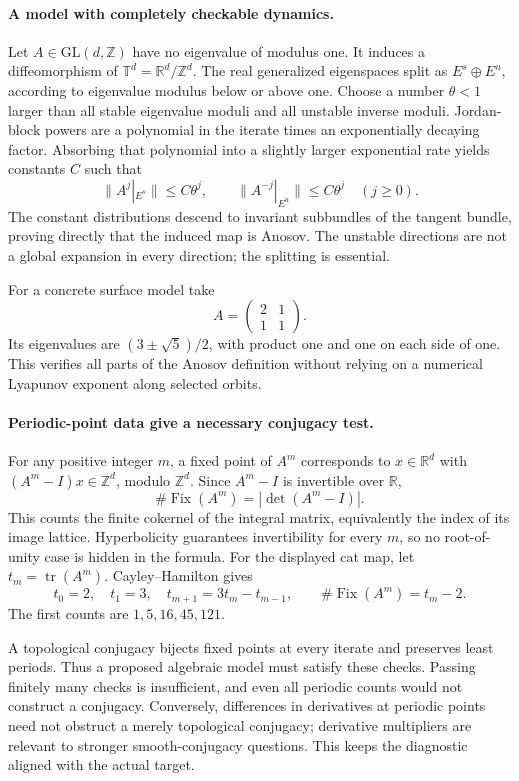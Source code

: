 \documentclass[11pt]{article}
\begin{document}
\paragraph{A model with completely checkable dynamics.}
Let $A\in\mathrm{GL}(d,\mathbb Z)$ have no eigenvalue of modulus one.
It induces a diffeomorphism of $\mathbb T^d=\mathbb R^d/\mathbb Z^d$.
The real generalized eigenspaces split as $E^s\oplus E^u$, according
to eigenvalue modulus below or above one. Choose a number $\theta<1$
larger than all stable eigenvalue moduli and all unstable inverse
moduli. Jordan-block powers are a polynomial in the iterate times
an exponentially decaying factor. Absorbing that polynomial into a
slightly larger exponential rate yields constants $C$ such that
\[
 \|A^j|_{E^s}\|\le C\theta^j,
 \qquad \|A^{-j}|_{E^u}\|\le C\theta^j\quad(j\ge0).
\]
The constant distributions descend to invariant subbundles of the
tangent bundle, proving directly that the induced map is Anosov.
The unstable directions are not a global expansion in every direction;
the splitting is essential.

For a concrete surface model take
\[
                   A=\begin{pmatrix}2&1\\1&1\end{pmatrix}.
\]
Its eigenvalues are $(3\pm\sqrt5)/2$, with product one and one on
each side of one. This verifies all parts of the Anosov definition
without relying on a numerical Lyapunov exponent along selected orbits.

\paragraph{Periodic-point data give a necessary conjugacy test.}
For any positive integer $m$, a fixed point of $A^m$ corresponds to
$x\in\mathbb R^d$ with $(A^m-I)x\in\mathbb Z^d$, modulo
$\mathbb Z^d$. Since $A^m-I$ is invertible over $\mathbb R$,
\[
             \#\operatorname{Fix}(A^m)=|\det(A^m-I)|.
\]
This counts the finite cokernel of the integral matrix, equivalently
the index of its image lattice. Hyperbolicity guarantees invertibility
for every $m$, so no root-of-unity case is hidden in the formula.
For the displayed cat map, let $t_m=\operatorname{tr}(A^m)$.
Cayley--Hamilton gives
\[
 t_0=2,\quad t_1=3,\quad t_{m+1}=3t_m-t_{m-1},
 \qquad \#\operatorname{Fix}(A^m)=t_m-2.
\]
The first counts are $1,5,16,45,121$.

A topological conjugacy bijects fixed points at every iterate and
preserves least periods. Thus a proposed algebraic model must satisfy
these checks. Passing finitely many checks is insufficient, and even
all periodic counts would not construct a conjugacy. Conversely,
differences in derivatives at periodic points need not obstruct a
merely topological conjugacy; derivative multipliers are relevant to
stronger smooth-conjugacy questions. This keeps the diagnostic aligned
with the actual target.
\end{document}
